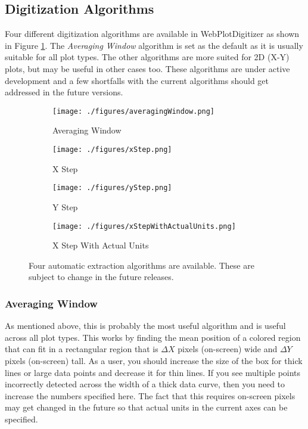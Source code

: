 \documentclass[letterpaper, 10pt]{article}
\begin{document}
\subsection{Digitization Algorithms}
Four different digitization algorithms are available in WebPlotDigitizer as shown in Figure \ref{fig:autoExtractAlgos}. The \emph{Averaging Window} algorithm is set as the default as it is usually suitable for all plot types. The other algorithms are more suited for 2D (X-Y) plots, but may be useful in other cases too. These algorithms are under active development and a few shortfalls with the current algorithms should get addressed in the future versions. 
\begin{figure}
\begin{subfigure}[b]{0.3\textwidth}
\texttt{[image: ./figures/averagingWindow.png]}
\caption{Averaging Window}
\end{subfigure}
\begin{subfigure}[b]{0.3\textwidth}
\texttt{[image: ./figures/xStep.png]}
\caption{X Step}
\end{subfigure}
\begin{subfigure}[b]{0.3\textwidth}
\texttt{[image: ./figures/yStep.png]}
\caption{Y Step}
\end{subfigure}
\centering
\begin{subfigure}[b]{0.3\textwidth}
\texttt{[image: ./figures/xStepWithActualUnits.png]}
\caption{X Step With Actual Units}
\end{subfigure}
\caption{Four automatic extraction algorithms are available. These are subject to change in the future releases.}
\label{fig:autoExtractAlgos}

\end{figure}
\subsubsection{Averaging Window}
As mentioned above, this is probably the most useful algorithm and is useful across all plot types. This works by finding the mean position of a colored region that can fit in a rectangular region that is $\Delta X$ pixels (on-screen) wide and $\Delta Y$ pixels (on-screen) tall. As a user, you should increase the size of the box for thick lines or large data points and decrease it for thin lines. If you see multiple points incorrectly detected across the width of a thick data curve, then you need to increase the numbers specified here. The fact that this requires on-screen pixels may get changed in the future so that actual units in the current axes can be specified.
\end{document}
